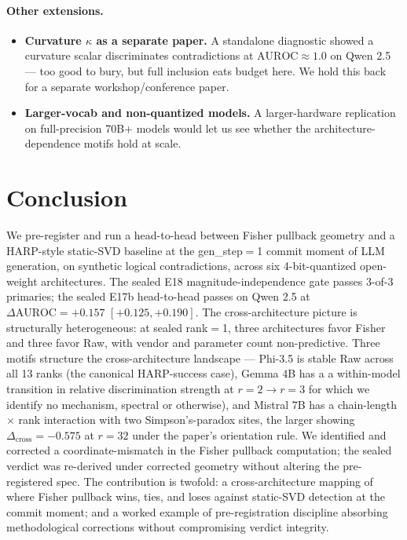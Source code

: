 \documentclass[10pt, letterpaper]{article}
\newcommand{\auroc}{\text{AUROC}}
\newcommand{\Dcross}{\Delta_{\text{cross}}}
\begin{document}
\paragraph{Other extensions.}
\begin{itemize}[leftmargin=*, itemsep=2pt, topsep=2pt]
  \item \textbf{Curvature $\kappa$ as a separate paper.} A standalone
  diagnostic showed a curvature scalar discriminates contradictions
  at $\auroc \approx 1.0$ on Qwen 2.5 --- too good to bury, but full
  inclusion eats budget here. We hold this back for a separate
  workshop/conference paper.
  \item \textbf{Larger-vocab and non-quantized models.} A
  larger-hardware replication on full-precision 70B+ models would
  let us see whether the architecture-dependence motifs hold at
  scale.
\end{itemize}

\section{Conclusion}
\label{sec:conclusion}

We pre-register and run a head-to-head between Fisher pullback
geometry and a HARP-style static-SVD baseline at the gen\_step$=$1
commit moment of LLM generation, on synthetic logical contradictions,
across six 4-bit-quantized open-weight architectures. The sealed E18
magnitude-independence gate passes 3-of-3 primaries; the sealed E17b
head-to-head passes on Qwen 2.5 at $\Delta \auroc = +0.157$ $[+0.125,
+0.190]$. The cross-architecture picture is structurally heterogeneous:
at sealed rank$=$1, three architectures favor Fisher and three favor
Raw, with vendor and parameter count non-predictive. Three motifs
structure the cross-architecture landscape --- Phi-3.5 is stable Raw
across all 13 ranks (the canonical HARP-success case), Gemma 4B has a
a within-model transition in relative discrimination strength at
$r=2 \to r=3$ for which we identify no mechanism, spectral or
otherwise), and Mistral 7B has a chain-length $\times$ rank interaction
with two Simpson's-paradox sites, the larger showing
$\Dcross = -0.575$ at $r=32$ under the paper's orientation rule. We
identified and corrected a coordinate-mismatch in the Fisher pullback
computation; the sealed verdict was re-derived under corrected
geometry without altering the pre-registered spec. The contribution
is twofold: a cross-architecture mapping of where Fisher pullback
wins, ties, and loses against static-SVD detection at the commit
moment; and a worked example of pre-registration discipline absorbing
methodological corrections without compromising verdict integrity.
\end{document}
